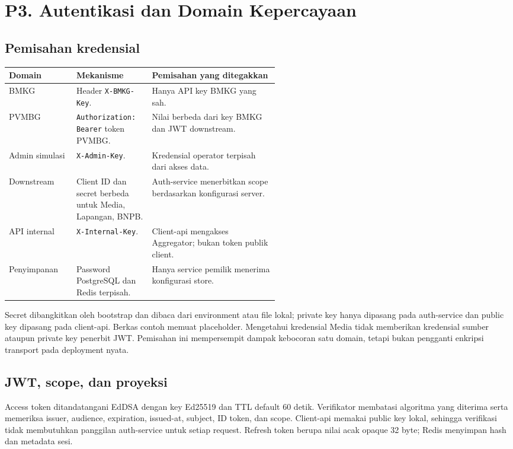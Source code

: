 \clearpage
\section{P3. Autentikasi dan Domain Kepercayaan}
\label{sec:p3}
\subsection{Pemisahan kredensial}
\begin{tabularx}{\linewidth}{P{0.25\linewidth}P{0.28\linewidth}Y}
\toprule Domain & Mekanisme & Pemisahan yang ditegakkan\\\midrule
BMKG & Header \texttt{X-BMKG-Key}. & Hanya API key BMKG yang sah.\\
PVMBG & \texttt{Authorization: Bearer} token PVMBG. & Nilai berbeda dari key BMKG dan JWT downstream.\\
Admin simulasi & \texttt{X-Admin-Key}. & Kredensial operator terpisah dari akses data.\\
Downstream & Client ID dan secret berbeda untuk Media, Lapangan, BNPB. & Auth-service menerbitkan scope berdasarkan konfigurasi server.\\
API internal & \texttt{X-Internal-Key}. & Client-api mengakses Aggregator; bukan token publik client.\\
Penyimpanan & Password PostgreSQL dan Redis terpisah. & Hanya service pemilik menerima konfigurasi store.\\
\bottomrule
\end{tabularx}

Secret dibangkitkan oleh bootstrap dan dibaca dari environment atau file lokal; private key hanya dipasang pada auth-service dan public key dipasang pada client-api. Berkas contoh memuat placeholder. Mengetahui kredensial Media tidak memberikan kredensial sumber ataupun private key penerbit JWT. Pemisahan ini mempersempit dampak kebocoran satu domain, tetapi bukan pengganti enkripsi transport pada deployment nyata.

\subsection{JWT, scope, dan proyeksi}
Access token ditandatangani EdDSA dengan key Ed25519 dan TTL default 60 detik. Verifikator membatasi algoritma yang diterima serta memeriksa issuer, audience, expiration, issued-at, subject, ID token, dan scope. Client-api memakai public key lokal, sehingga verifikasi tidak membutuhkan panggilan auth-service untuk setiap request. Refresh token berupa nilai acak opaque 32 byte; Redis menyimpan hash dan metadata sesi.

